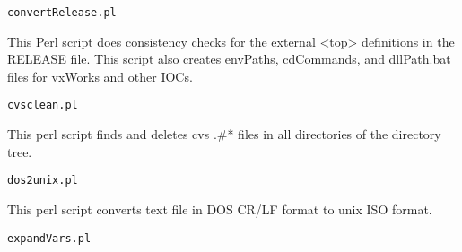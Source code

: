 \begin{verbatim}convertRelease.pl
\end{verbatim}
\begin{description}\item This Perl script does consistency checks for the external \textless{}top\textgreater{} definitions in the RELEASE file. This script also 
creates envPaths, cdCommands, and dllPath.bat files for vxWorks and other IOCs.

\end{description}\begin{verbatim}cvsclean.pl
\end{verbatim}\begin{description}\item This perl script finds and deletes cvs .\#* files in all directories of the directory tree.

\end{description}\begin{verbatim}dos2unix.pl
\end{verbatim}\begin{description}\item This perl script converts text file in DOS CR/LF format to unix ISO format.

\end{description}\begin{verbatim}expandVars.pl
\end{verbatim}
